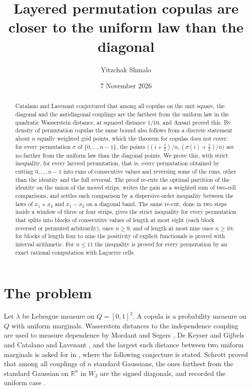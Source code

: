 \documentclass[11pt]{amsart}
\title[Layered permutations and the farthest copula]{Layered permutation copulas are closer to the uniform law than the diagonal}
\author{Yitzchak Shmalo}
\date{7 November 2026}
\theoremstyle{definition}
\theoremstyle{remark}
\numberwithin{equation}{section}
\newcommand{\R}{\mathbb{R}}
\begin{document}
\begin{abstract}
Catalano and Lavenant conjectured that among all copulas on the unit square, the diagonal and the antidiagonal
couplings are the farthest from the uniform law in the quadratic Wasserstein distance, at squared distance $1/10$, and
Ansari proved this. By density of permutation copulas the same bound also follows from a discrete statement about $n$
equally weighted grid points, which the theorem for copulas does not cover: for every
permutation $\sigma$ of $\{0,\dots,n-1\}$, the points $\bigl((i+\frac12)/n,(\sigma(i)+\frac12)/n\bigr)$ are no farther
from the uniform law than the diagonal points. We prove this, with strict inequality, for every layered permutation,
that is, every permutation obtained by cutting $0,\dots,n-1$ into runs of consecutive values and reversing some of the
runs, other than the identity and the full reversal. The proof re-cuts the optimal partition of the identity on the
union of the moved strips, writes the gain as a weighted sum of two-cell comparisons, and settles each comparison by a
dispersive-order inequality between the laws of $x_1+x_2$ and $x_1-x_2$ on a diagonal band. The same re-cut, done
in two steps inside a window of three or four strips, gives the strict inequality for every permutation that splits
into blocks of consecutive values of length at most eight (each block reversed or permuted arbitrarily), once $n\ge9$,
and of length at most nine once $n\ge10$; for blocks of length four to nine the positivity of explicit functionals is
proved with interval arithmetic. For $n\le11$ the inequality is proved for every permutation by an exact rational
computation with Laguerre cells.
\end{abstract}

\maketitle

\section{The problem}

Let $\lambda$ be Lebesgue measure on $Q=[0,1]^2$. A copula is a probability measure on $Q$ with uniform marginals.
Wasserstein distances to the independence coupling are used to measure dependence by Mordant and Segers \cite{MS},
De Keyser and Gijbels \cite{DKG} and Catalano and Lavenant \cite{CL}, and the largest such distance between two
uniform marginals is asked for in \cite[Remark~3]{CL}, where the following conjecture is stated. Schrott \cite{Schrott}
proved that among all couplings of $n$ standard Gaussians, the ones farthest from the standard Gaussian on $\R^n$ in
$W_2$ are the signed diagonals, and recorded the uniform case \cite[Conjecture~1.1]{Schrott}.
\end{document}
